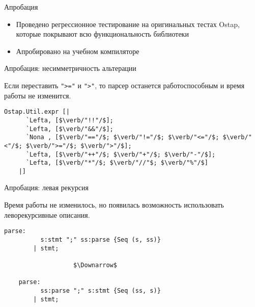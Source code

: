 \documentclass[10pt, mathserif]{beamer}
\theoremstyle{definition}
\begin{document}
\begin{frame}[fragile]{Апробация}
  \begin{itemize}
     \item Проведено регрессионное тестирование на оригинальных тестах Ostap, которые покрывают всю функциональность библиотеки
     \vskip3mm

     \item Апробировано на учебном компиляторе
  \end{itemize}
\end{frame}

\begin{frame}[fragile]{Апробация: несимметричность альтерации}

  Если переставить \lstinline|">="| и \lstinline|">"|, то парсер останется работоспособным и время работы не изменится.

  \begin{lstlisting}[basicstyle=\small]
    Ostap.Util.expr [|
      `Lefta, [$\verb/"!!"/$];
      `Lefta, [$\verb/"&&"/$];
      `Nona , [$\verb/"=="/$; $\verb/"!="/$; $\verb/"<="/$; $\verb/"<"/$; $\verb/">="/$; $\verb/">"/$];
      `Lefta, [$\verb/"++"/$; $\verb/"+"/$; $\verb/"-"/$];
      `Lefta, [$\verb/"*"/$; $\verb/"//"$; $\verb/"%"/$]
    |]
  \end{lstlisting}
  \vskip3mm
\end{frame}

\begin{frame}[fragile]{Апробация: левая рекурсия}

  Время работы не изменилось, но появилась возможность использовать леворекурсивные описания.
  \vskip3mm
  \begin{lstlisting}[basicstyle=\small]
    parse:
          s:stmt ";" ss:parse {Seq (s, ss)}
        | stmt;

                   $\Downarrow$

    parse:
          ss:parse ";" s:stmt {Seq (ss, s)}
        | stmt;

  \end{lstlisting}

\end{frame}
\end{document}
